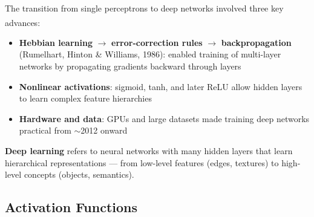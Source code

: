 \begin{tcbitemize}[ skin=sectionraster ]
\begin{center}
\label{fig:ch06-deep-learning-inline-01}
    \end{center}

    \tcbitem[title={From Perceptrons to Deep Learning}, raster multicolumn=6]
    The transition from single perceptrons to deep networks involved three key advances\textsuperscript{\cite[][pp.~1--3]{fleuretLittleBookDeep}}:
    \begin{itemize}
        \item \textbf{Hebbian learning} $\to$ \textbf{error-correction rules} $\to$ \textbf{backpropagation} (Rumelhart, Hinton \& Williams, 1986): enabled training of multi-layer networks by propagating gradients backward through layers
        \item \textbf{Nonlinear activations}: sigmoid, tanh, and later ReLU allow hidden layers to learn complex feature hierarchies
        \item \textbf{Hardware and data}: GPUs and large datasets made training deep networks practical from $\sim$2012 onward
    \end{itemize}
    \textbf{Deep learning} refers to neural networks with many hidden layers that learn hierarchical representations --- from low-level features (edges, textures) to high-level concepts (objects, semantics).
\end{tcbitemize}

\subsection{Activation Functions}

